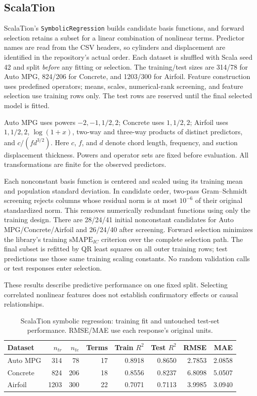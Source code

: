 \documentclass{article}
\begin{document}
\subsection{ScalaTion}

ScalaTion's \texttt{SymbolicRegression} builds candidate basis functions, and forward selection retains a subset for a linear combination of nonlinear terms. Predictor names are read from the CSV headers, so cylinders and displacement are identified in the repository's actual order. Each dataset is shuffled with Scala seed 42 and split \emph{before} any fitting or selection. The training/test sizes are 314/78 for Auto MPG, 824/206 for Concrete, and 1203/300 for Airfoil. Feature construction uses predefined operators; means, scales, numerical-rank screening, and feature selection use training rows only. The test rows are reserved until the final selected model is fitted.

Auto MPG uses powers $-2,-1,1/2,2$; Concrete uses $1,1/2,2$; Airfoil uses $1,1/2,2$, $\log(1+x)$, two-way and three-way products of distinct predictors, and $c/(f d^{3/2})$. Here $c$, $f$, and $d$ denote chord length, frequency, and suction displacement thickness. Powers and operator sets are fixed before evaluation. All transformations are finite for the observed predictors.

Each nonconstant basis function is centered and scaled using its training mean and population standard deviation. In candidate order, two-pass Gram--Schmidt screening rejects columns whose residual norm is at most $10^{-6}$ of their original standardized norm. This removes numerically redundant functions using only the training design. There are 28/24/41 initial nonconstant candidates for Auto MPG/Concrete/Airfoil and 26/24/40 after screening. Forward selection minimizes the library's training $\mathrm{sMAPE}_{IC}$ criterion over the complete selection path. The final subset is refitted by QR least squares on all outer training rows; test predictions use those same training scaling constants. No random validation calls or test responses enter selection.

These results describe predictive performance on one fixed split. Selecting correlated nonlinear features does not establish confirmatory effects or causal relationships.

\begin{table}[H]
\centering\small
\caption{ScalaTion symbolic regression: training fit and untouched test-set performance. RMSE/MAE use each response's original units.}
\label{tab:scalation-symbolic-results}
\begin{tabular}{lrrrrrrr}
\toprule
Dataset & $n_{tr}$ & $n_{te}$ & Terms & Train $R^2$ & Test $R^2$ & RMSE & MAE \\
\midrule
Auto MPG & 314 & 78 & 17 & 0.8918 & 0.8650 & 2.7853 & 2.0858 \\
Concrete & 824 & 206 & 18 & 0.8556 & 0.8237 & 6.8098 & 5.0507 \\
Airfoil & 1203 & 300 & 22 & 0.7071 & 0.7113 & 3.9985 & 3.0940 \\
\bottomrule
\end{tabular}
\end{table}
\end{document}
